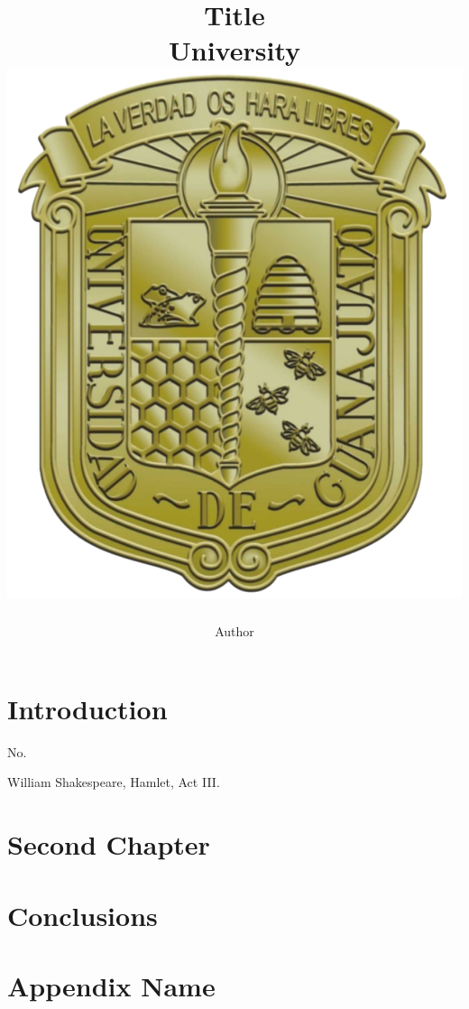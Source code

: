 \documentclass[10pt,letterpaper,twoside,openright]{report}
\title{
{Title}\\
{\large University}\\
{\includegraphics{images/UGTO.png}}
}
\author{Author}
\begin{document}








\listofcontents

\listoffigures

\listoftables

\chapter{Introduction}
\epigraph{No.}{William Shakespeare, Hamlet, Act III.}


\chapter{Second Chapter}


\chapter{Conclusions}


\appendix
\chapter{Appendix Name}


\pagestyle{plain}



\end{document}
